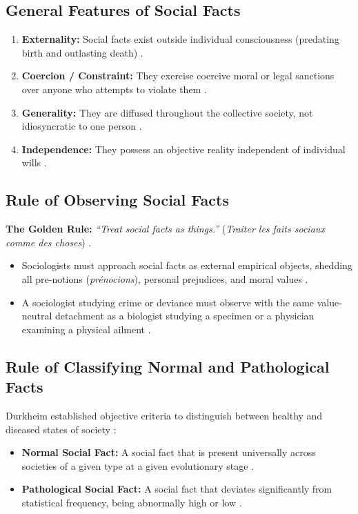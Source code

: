 \subsection{General Features of Social Facts}
\begin{enumerate}
    \item \textbf{Externality:} Social facts exist outside individual consciousness (predating birth and outlasting death) .
    \item \textbf{Coercion / Constraint:} They exercise coercive moral or legal sanctions over anyone who attempts to violate them .
    \item \textbf{Generality:} They are diffused throughout the collective society, not idiosyncratic to one person .
    \item \textbf{Independence:} They possess an objective reality independent of individual wills .
\end{enumerate}

\subsection{Rule of Observing Social Facts}

\begin{CriticalPoint}
\textbf{The Golden Rule:} \textit{``Treat social facts as things.''} (\textit{Traiter les faits sociaux comme des choses}) .
\begin{itemize}
    \item Sociologists must approach social facts as external empirical objects, shedding all pre-notions (\textit{prénocions}), personal prejudices, and moral values .
    \item A sociologist studying crime or deviance must observe with the same value-neutral detachment as a biologist studying a specimen or a physician examining a physical ailment .
\end{itemize}
\end{CriticalPoint}

\subsection{Rule of Classifying Normal and Pathological Facts}
Durkheim established objective criteria to distinguish between healthy and diseased states of society :
\begin{itemize}
    \item \textbf{Normal Social Fact:} A social fact that is present universally across societies of a given type at a given evolutionary stage .
    \item \textbf{Pathological Social Fact:} A social fact that deviates significantly from statistical frequency, being abnormally high or low .
\end{itemize}

